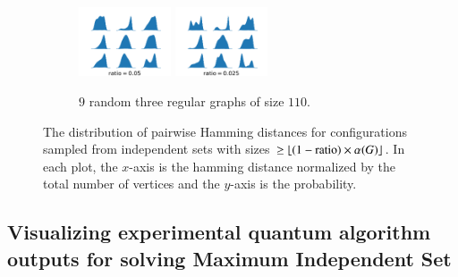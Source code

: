 \documentclass[onefignum, onetabnum]{siamart190516}
\newcommand{\<}{\langle}
\renewcommand{\>}{\rangle}
\begin{document}
\begin{figure}
\begin{subfigure}[t]{\textwidth}
        \includegraphics[width=0.3\textwidth, trim={0.5cm 0cm 0.5cm 1cm}, clip]{figures/grid-regular-size110d3-k3-alpha0.05-n10000.pdf}
        \includegraphics[width=0.3\textwidth, trim={0.5cm 0cm 0.5cm 1cm}, clip]{figures/grid-regular-size110d3-k3-alpha0.025-n10000.pdf}
        \caption{$9$ random three regular graphs of size $110$.}
    \end{subfigure}
    \caption{The distribution of pairwise Hamming distances for configurations sampled from independent sets with sizes $\geq \lfloor(1-{\rm ratio}) \times \alpha(G)\rfloor$.
    In each plot, the $x$-axis is the hamming distance normalized by the total number of vertices and the $y$-axis is the probability.
    }
    \label{fig:hamming}
\end{figure}

\subsection{Visualizing experimental quantum algorithm outputs for solving Maximum Independent Set}
\end{document}
